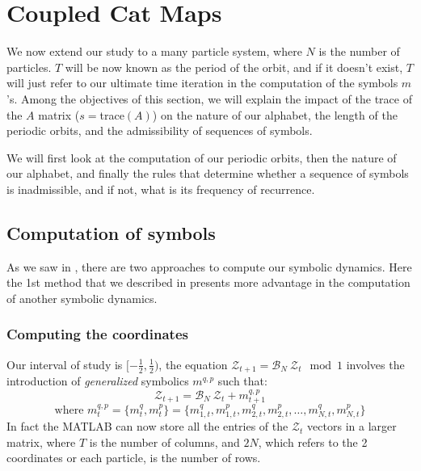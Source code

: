 
\section{Coupled Cat Maps}

\hskip 0.2in We now extend our study to a many particle system, where $N$
is the number of particles. $T$ will be now known as the period of the
orbit, and if it doesn't exist, $T$ will just refer to our ultimate time
iteration in the computation of the symbols $m$'s. Among the objectives
of this section, we will explain the impact of the trace of the $A$
matrix ($s = $trace$(A)$) on the nature of our alphabet, the length of
the periodic orbits, and the admissibility of sequences of symbols.

We will first look at the computation of our periodic orbits, then the
nature of our alphabet, and finally the rules that determine whether a
sequence of symbols is inadmissible, and if not, what is its frequency of
recurrence.

\subsection{Computation of symbols}

As we saw in , there are two approaches to
compute our symbolic dynamics. Here the 1st method that we described in
 presents more advantage in the computation of
another symbolic dynamics.

\subsubsection{Computing the coordinates}

Our interval of study is $[-\frac{1}{2}, \frac{1}{2})$, the equation
$\mathcal{Z}_{t+1} = \mathcal{B}_N \: \mathcal{Z}_{t} \mod 1$ involves
the introduction of \textit{generalized} symbolics $m^{q,p}$ such that:
\[
\mathcal{Z}_{t+1} = \mathcal{B}_N \: \mathcal{Z}_{t} + m^{q,p}_{t+1}
\]
\[
\text{where  } m^{q,p}_t = \{m^q_t, m^p_t\} = \{m^q_{1,t}, m^p_{1,t}, m^q_{2,t}, m^p_{2,t}, \dots, m^q_{N,t}, m^p_{N,t}\}
\]
In fact the MATLAB can now store all the entries of the $\mathcal{Z}_t$
vectors in a larger matrix, where $T$ is the number of columns, and $2N$,
which refers to the 2 coordinates or each particle, is the number of
rows.

